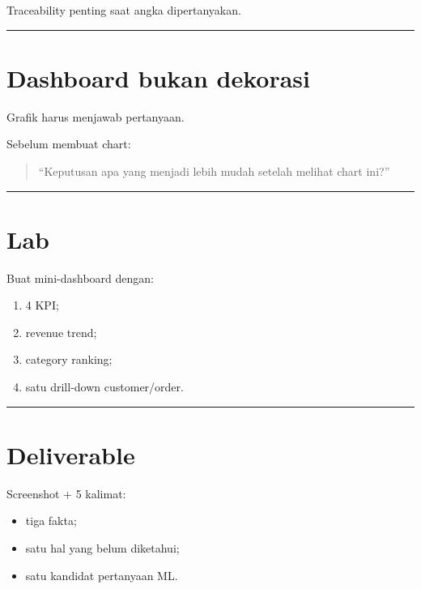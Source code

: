 \documentclass[
  indonesian,
  letterpaper,
  DIV=11,
  numbers=noendperiod]{scrreprt}
\providecommand{\tightlist}{%
  \setlength{\itemsep}{0pt}\setlength{\parskip}{0pt}}
\begin{document}
Traceability penting saat angka dipertanyakan.

\begin{center}\rule{0.5\linewidth}{0.5pt}\end{center}

\section{Dashboard bukan dekorasi}\label{dashboard-bukan-dekorasi}

Grafik harus menjawab pertanyaan.

Sebelum membuat chart:

\begin{quote}
``Keputusan apa yang menjadi lebih mudah setelah melihat chart ini?''
\end{quote}

\begin{center}\rule{0.5\linewidth}{0.5pt}\end{center}

\section{Lab}\label{lab-2}

Buat mini-dashboard dengan:

\begin{enumerate}
\def\labelenumi{\arabic{enumi}.}
\tightlist
\item
  4 KPI;
\item
  revenue trend;
\item
  category ranking;
\item
  satu drill-down customer/order.
\end{enumerate}

\begin{center}\rule{0.5\linewidth}{0.5pt}\end{center}

\section{Deliverable}\label{deliverable-2}

Screenshot + 5 kalimat:

\begin{itemize}
\tightlist
\item
  tiga fakta;
\item
  satu hal yang belum diketahui;
\item
  satu kandidat pertanyaan ML.
\end{itemize}
\end{document}
